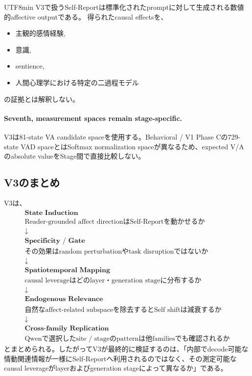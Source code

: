 \documentclass{article} %
\begin{document}
\begin{CJK*}{UTF8}{min}
V3で扱うSelf-Reportは標準化されたpromptに対して生成される数値的affective outputである。
得られたcausal effectsを、
\begin{itemize}
    \item 主観的感情経験,
    \item 意識,
    \item sentience,
    \item 人間心理学における特定の二過程モデル
\end{itemize}
の証拠とは解釈しない。


\paragraph{Seventh, measurement spaces remain stage-specific.}

V3は81-state VA candidate spaceを使用する。Behavioral / V1 Phase Cの729-state VAD spaceとはSoftmax normalization spaceが異なるため、expected V/Aのabsolute valueをStage間で直接比較しない。


\subsection{V3のまとめ}

V3は、
\[
\begin{array}{c}
\textbf{State Induction}
\\
\text{Reader-grounded affect directionはSelf-Reportを動かせるか}
\\[5pt]
\downarrow
\\[5pt]
\textbf{Specificity / Gate}
\\
\text{その効果はrandom perturbationやtask disruptionではないか}
\\[5pt]
\downarrow
\\[5pt]
\textbf{Spatiotemporal Mapping}
\\
\text{causal leverageはどのlayer・generation stageに分布するか}
\\[5pt]
\downarrow
\\[5pt]
\textbf{Endogenous Relevance}
\\
\text{自然なaffect-related subspaceを除去するとSelf shiftは減衰するか}
\\[5pt]
\downarrow
\\[5pt]
\textbf{Cross-family Replication}
\\
\text{Qwenで選択したsite / stageのpatternは他familiesでも確認されるか}
\end{array}
\]
とまとめられる。したがってV3が最終的に検証するのは、「内部でdecode可能な情動関連情報が一様にSelf-Reportへ利用されるのではなく、その測定可能なcausal leverageがlayerおよびgeneration stageによって異なるか」である。


\end{CJK*}
\end{document}
